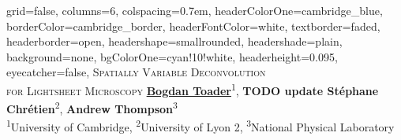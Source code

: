 \documentclass[a0paper,portrait,fontscale=0.35]{baposter}
\theoremstyle{plain}
\theoremstyle{plain}
\theoremstyle{definition}
\theoremstyle{plain}
\theoremstyle{definition}
\begin{document}

\begin{poster}
{
    grid=false,
    columns=6,
    colspacing=0.7em,
    headerColorOne=cambridge_blue,
    borderColor=cambridge_border,
    headerFontColor=white,
    textborder=faded,
    headerborder=open,
    headershape=smallrounded,
    headershade=plain,
    background=none,
    bgColorOne=cyan!10!white,
    headerheight=0.095\textheight,
    eyecatcher=false,
}
{
}
{
  \textsc{Spatially Variable Deconvolution\vspace{0.2cm}\\ 
    for Lightsheet Microscopy\vspace{0.2em}}
  \vspace{0.3em}
}
{
  \vspace{0.1em}
  \hspace{-0.65em}
  {
    \underline{\textbf{Bogdan Toader}}\textsuperscript{1},
    \textbf{TODO update St\'{e}phane Chr\'{e}tien}\textsuperscript{2}, 
    \textbf{Andrew Thompson}\textsuperscript{3}
  } \\[0.2em]
  {
    \textsuperscript{1}University of Cambridge,
    \textsuperscript{2}University of Lyon 2, 
    \textsuperscript{3}National Physical Laboratory
  }
}

\end{poster}
\end{document}
